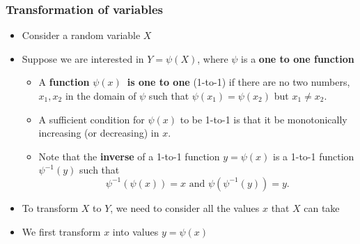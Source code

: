 \documentclass[notes=show,smaller,handout]{beamer}
\newenvironment{stepitemize}{\begin{itemize}[<+->]}{\end{itemize} }
\begin{document}
\begin{frame}

\frametitle{Transformation of variables}

\begin{stepitemize}
\item Consider a random variable $X$

\item Suppose we are interested in $Y=\psi(X)$, where $\psi $ is a \textbf{%
one to one function}

\begin{stepitemize}
\item A \textbf{function }$\psi \left( x\right) $\textbf{\ is one to one}
(1-to-1) if there are no two numbers, $x_{1},x_{2}$ in the domain of $\psi $
such that $\psi \left( x_{1}\right) =\psi \left( x_{2}\right) $ but $%
x_{1}\neq x_{2}$.

\item A sufficient condition for $\psi \left( x\right) $ to be 1-to-1 is
that it be monotonically increasing (or decreasing) in $x$.

\item Note that the \textbf{inverse} of a 1-to-1 function $y=\psi \left(
x\right) $ is a 1-to-1 function $\psi^{-1}\left( y\right) $ such that 
\begin{equation*}
\psi ^{-1}\left( \psi \left( x\right) \right) =x\text{ and }\psi \left( \psi
^{-1}\left( y\right) \right) =y.
\end{equation*}
\end{stepitemize}

\item To transform $X$ to $Y$, we need to consider all the values $x$ that $%
X $ can take

\item We first transform $x$ into values $y=\psi (x)$
\end{stepitemize}

\end{frame}%
\end{document}
